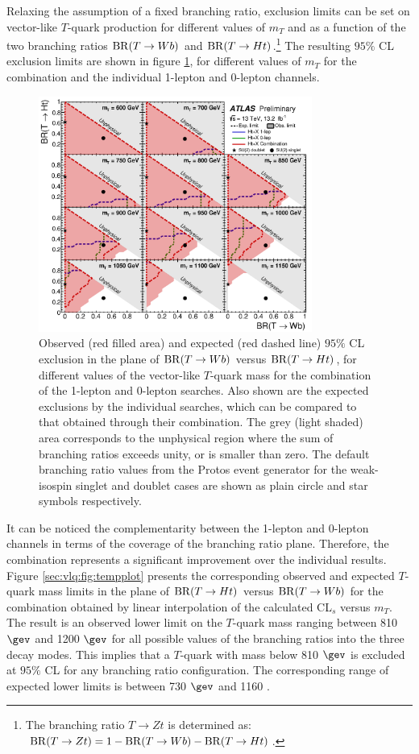 Relaxing the assumption of a fixed branching ratio, exclusion limits can be set on vector-like $T$-quark production for different values of $m_{T}$ and as a function of the two branching ratios ${\rm BR}(T \to Wb)$ and ${\rm BR}(T \to Ht)$.\footnote{The branching ratio $T \to Zt$ is determined as: ${\rm BR}(T \to Zt) = 1- {\rm BR}(T \to  Wb)-{\rm BR}(T \to Ht)$.} The resulting $95\%$ CL exclusion limits are shown in figure \ref{sec:vlq:fig:comb}, for different values of $m_{T}$ for the combination and the individual 1-lepton and 0-lepton channels. 
\begin{figure}[h!]
\centering
\includegraphics[width=0.8\textwidth]{figures/VLQ/fig_18.png}
 \captionsetup{width=0.85\textwidth} \caption{\small Observed (red filled area) and expected (red dashed line) $95\%$ CL exclusion in the plane of
${\rm BR}(T \to Wb)$ versus ${\rm BR}(T \to Ht)$, for different values of the vector-like $T$-quark mass for the combination of the 1-lepton and 0-lepton searches.
Also shown are the expected exclusions by the individual searches, which can be compared to that obtained through their combination.
The grey (light shaded) area corresponds to the unphysical region where the sum of branching ratios exceeds unity, or is smaller than zero.
The default branching ratio values from the {\sc Protos} event generator for the weak-isospin singlet and doublet cases 
are shown as plain circle and star symbols respectively.}
\label{sec:vlq:fig:comb}
\end{figure}
It can be noticed the complementarity between the 1-lepton and 0-lepton channels in terms of the coverage of the branching ratio plane. Therefore, the combination represents a significant improvement over the individual results. Figure \ref{sec:vlq:fig:tempplot} presents the corresponding observed and expected $T$-quark mass limits in the plane of ${\rm BR}(T \to Ht)$ versus ${\rm BR}(T \to Wb)$ for the combination obtained by linear interpolation of the calculated CL$_s$ versus $m_{T}$. The result is an observed lower limit on the $T$-quark mass ranging between 810 $\gev$ and 1200 $\gev$ for all possible values of the branching ratios into the three decay modes. This implies that a $T$-quark with mass below 810 $\gev$ is excluded at $95\%$ CL for any branching ratio configuration. The corresponding range of expected lower limits is between 730 $\gev$ and 1160 \gev.


